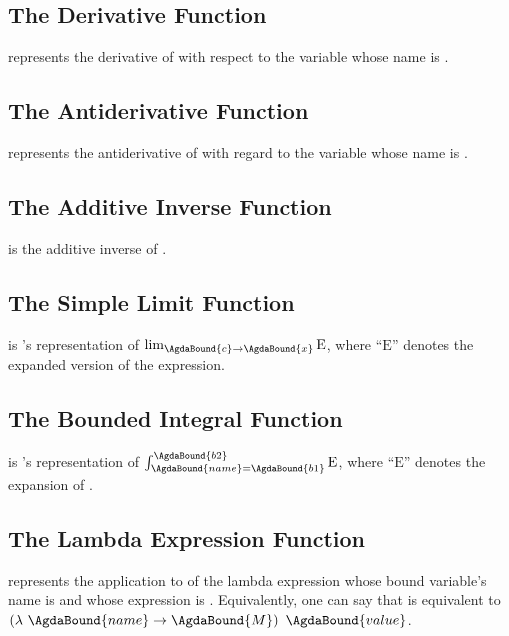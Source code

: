 \documentclass{report}
\newcommand{\Epsilon}{E}
\begin{document}
\subsection{The Derivative Function}
    represents the derivative of  with respect to the variable whose name is .

\subsection{The Antiderivative Function}
    represents the antiderivative of  with regard to the variable whose name is .

\subsection{The Additive Inverse Function}
   is the additive inverse of .

\subsection{The Simple Limit Function}
     is 's representation of \(\lim_{\AgdaBound{c} \rightarrow \AgdaBound{x}} \textrm{\Epsilon}\), where ``\(\textrm{\Epsilon}\)'' denotes the expanded version of the  expression.

\subsection{The Bounded Integral Function}
      is 's representation of \(\int_{\AgdaBound{name}=\AgdaBound{b1}}^{\AgdaBound{b2}} \mathrm{\Epsilon}\), where ``\(\mathrm{\Epsilon}\)'' denotes the expansion of .

\subsection{The Lambda Expression Function}
     represents the application to  of the lambda expression whose bound variable's name is  and whose expression is .  Equivalently, one can say that      is equivalent to \(\left(\lambda\ \AgdaBound{name} \rightarrow \AgdaBound{M}\right)\ \AgdaBound{value}\).
\end{document}
